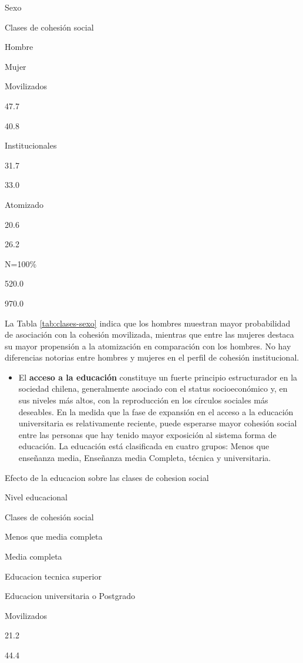 \documentclass[
  12pt,
]{book}
\providecommand{\tightlist}{%
  \setlength{\itemsep}{0pt}\setlength{\parskip}{0pt}}
\begin{document}
Sexo

Clases de cohesión social

Hombre

Mujer

Movilizados

47.7

40.8

Institucionales

31.7

33.0

Atomizado

20.6

26.2

N=100\%

520.0

970.0

La Tabla \ref{tab:clases-sexo} indica que los hombres muestran mayor probabilidad de asociación con la cohesión movilizada, mientras que entre las mujeres destaca su mayor propensión a la atomización en comparación con los hombres. No hay diferencias notorias entre hombres y mujeres en el perfil de cohesión institucional.

\begin{itemize}
\tightlist
\item
  El \textbf{acceso a la educación} constituye un fuerte principio estructurador en la sociedad chilena, generalmente asociado con el status socioeconómico y, en sus niveles más altos, con la reproducción en los círculos sociales más deseables. En la medida que la fase de expansión en el acceso a la educación universitaria es relativamente reciente, puede esperarse mayor cohesión social entre las personas que hay tenido mayor exposición al sistema forma de educación. La educación está clasificada en cuatro grupos: Menos que enseñanza media, Enseñanza media Completa, técnica y universitaria.
\end{itemize}

\label{tab:clases-educacion}Efecto de la educacion sobre las clases de cohesion social

Nivel educacional

Clases de cohesión social

Menos que media completa

Media completa

Educacion tecnica superior

Educacion universitaria o Postgrado

Movilizados

21.2

44.4
\end{document}
